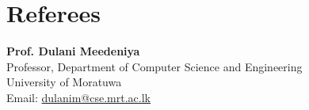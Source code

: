 



\section*{Referees}
\BigDivider
\vspace{-0.3em}

\noindent
\textbf{Prof. Dulani Meedeniya}\\
Professor, Department of Computer Science and Engineering\\
University of Moratuwa\\
Email: \href{mailto:dulanim@cse.mrt.ac.lk}{dulanim@cse.mrt.ac.lk}

